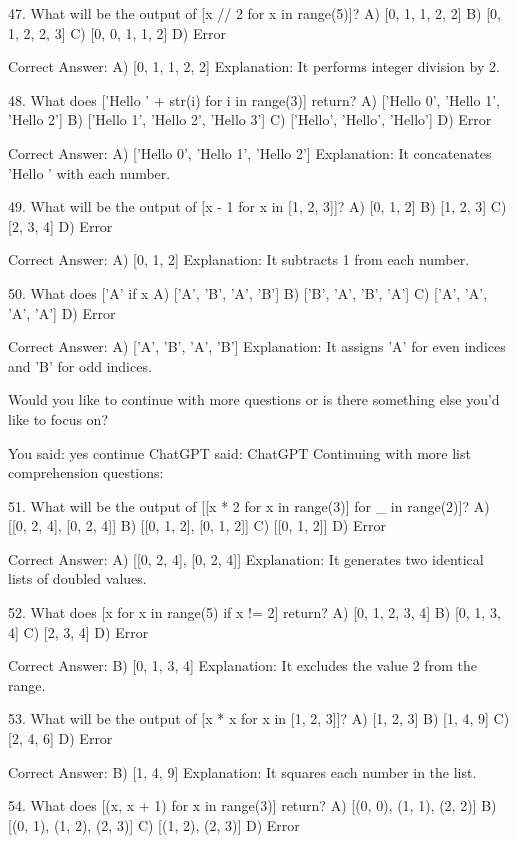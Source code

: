 47. What will be the output of [x // 2 for x in range(5)]?
A) [0, 1, 1, 2, 2]
B) [0, 1, 2, 2, 3]
C) [0, 0, 1, 1, 2]
D) Error

Correct Answer: A) [0, 1, 1, 2, 2]
Explanation: It performs integer division by 2.

48. What does ['Hello ' + str(i) for i in range(3)] return?
A) ['Hello 0', 'Hello 1', 'Hello 2']
B) ['Hello 1', 'Hello 2', 'Hello 3']
C) ['Hello', 'Hello', 'Hello']
D) Error

Correct Answer: A) ['Hello 0', 'Hello 1', 'Hello 2']
Explanation: It concatenates 'Hello ' with each number.

49. What will be the output of [x - 1 for x in [1, 2, 3]]?
A) [0, 1, 2]
B) [1, 2, 3]
C) [2, 3, 4]
D) Error

Correct Answer: A) [0, 1, 2]
Explanation: It subtracts 1 from each number.

50. What does ['A' if x %
A) ['A', 'B', 'A', 'B']
B) ['B', 'A', 'B', 'A']
C) ['A', 'A', 'A', 'A']
D) Error

Correct Answer: A) ['A', 'B', 'A', 'B']
Explanation: It assigns 'A' for even indices and 'B' for odd indices.

Would you like to continue with more questions or is there something else you'd like to focus on?






You said:
yes continue
ChatGPT said:
ChatGPT
Continuing with more list comprehension questions:

51. What will be the output of [[x * 2 for x in range(3)] for _ in range(2)]?
A) [[0, 2, 4], [0, 2, 4]]
B) [[0, 1, 2], [0, 1, 2]]
C) [[0, 1, 2]]
D) Error

Correct Answer: A) [[0, 2, 4], [0, 2, 4]]
Explanation: It generates two identical lists of doubled values.

52. What does [x for x in range(5) if x != 2] return?
A) [0, 1, 2, 3, 4]
B) [0, 1, 3, 4]
C) [2, 3, 4]
D) Error

Correct Answer: B) [0, 1, 3, 4]
Explanation: It excludes the value 2 from the range.

53. What will be the output of [x * x for x in [1, 2, 3]]?
A) [1, 2, 3]
B) [1, 4, 9]
C) [2, 4, 6]
D) Error

Correct Answer: B) [1, 4, 9]
Explanation: It squares each number in the list.

54. What does [(x, x + 1) for x in range(3)] return?
A) [(0, 0), (1, 1), (2, 2)]
B) [(0, 1), (1, 2), (2, 3)]
C) [(1, 2), (2, 3)]
D) Error

